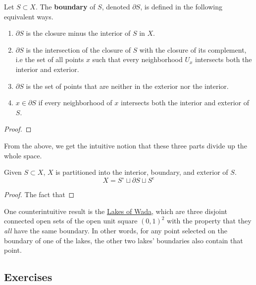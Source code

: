  \begin{definition}[Boundary]
    Let $S \subset X$. The \textbf{boundary} of $S$, denoted $\partial S$, is defined in the following equivalent ways. 
    \begin{enumerate}
      \item $\partial S$ is the closure minus the interior of $S$ in $X$. 
      \item $\partial S$ is the intersection of the closure of $S$ with the closure of its complement, i.e the set of all points $x$ such that every neighborhood $U_x$ intersects both the interior and exterior. 
      \item $\partial S$ is the set of points that are neither in the exterior nor the interior. 
      \item $x \in \partial S$ if every neighborhood of $x$ intersects both the interior and exterior of $S$. 
    \end{enumerate}
  \end{definition}
  \begin{proof}
    
  \end{proof}

  From the above, we get the intuitive notion that these three parts divide up the whole space. 

  \begin{theorem}
    Given $S \subset X$, $X$ is partitioned into the interior, boundary, and exterior of $S$. 
    \begin{equation}
      X = S^\circ \sqcup \partial S \sqcup S^e
    \end{equation}
  \end{theorem}
  \begin{proof}
    The fact that 
  \end{proof}

  One counterintuitive result is the \href{https://en.wikipedia.org/wiki/Lakes_of_Wada}{Lakes of Wada}, which are three disjoint connected open sets of the open unit square $(0, 1)^2$ with the property that they \textit{all} have the same boundary. In other words, for any point selected on the boundary of one of the lakes, the other two lakes' boundaries also contain that point. 

\subsection{Exercises} 

